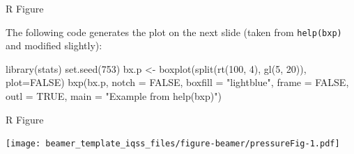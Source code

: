 \documentclass[12pt,ignorenonframetext,compress]{beamer}
\newenvironment{Shaded}{}{}
\newcommand{\DataTypeTok}[1]{#1}
\newcommand{\DecValTok}[1]{#1}
\newcommand{\KeywordTok}[1]{\textcolor[rgb]{0.00,0.00,1.00}{#1}}
\newcommand{\NormalTok}[1]{#1}
\newcommand{\OtherTok}[1]{\textcolor[rgb]{1.00,0.25,0.00}{#1}}
\newcommand{\StringTok}[1]{\textcolor[rgb]{0.00,0.50,0.50}{#1}}
\begin{document}
\begin{frame}[fragile]{R Figure}
\protect\hypertarget{r-figure}{}

The following code generates the plot on the next slide (taken from
\texttt{help(bxp)} and modified slightly):

\begin{Shaded}
\begin{Highlighting}[]
\KeywordTok{library}\NormalTok{(stats)}
\KeywordTok{set.seed}\NormalTok{(}\DecValTok{753}\NormalTok{)}
\NormalTok{bx.p <-}\StringTok{ }\KeywordTok{boxplot}\NormalTok{(}\KeywordTok{split}\NormalTok{(}\KeywordTok{rt}\NormalTok{(}\DecValTok{100}\NormalTok{, }\DecValTok{4}\NormalTok{),}
                      \KeywordTok{gl}\NormalTok{(}\DecValTok{5}\NormalTok{, }\DecValTok{20}\NormalTok{)), }\DataTypeTok{plot=}\OtherTok{FALSE}\NormalTok{)}
\KeywordTok{bxp}\NormalTok{(bx.p, }\DataTypeTok{notch =} \OtherTok{FALSE}\NormalTok{, }\DataTypeTok{boxfill =} \StringTok{"lightblue"}\NormalTok{,}
    \DataTypeTok{frame =} \OtherTok{FALSE}\NormalTok{, }\DataTypeTok{outl =} \OtherTok{TRUE}\NormalTok{,}
    \DataTypeTok{main =} \StringTok{"Example from help(bxp)"}\NormalTok{)}
\end{Highlighting}
\end{Shaded}

\end{frame}

\begin{frame}{R Figure}
\protect\hypertarget{r-figure-1}{}

\texttt{[image: beamer\_template\_iqss\_files/figure-beamer/pressureFig-1.pdf]}

\end{frame}
\end{document}
